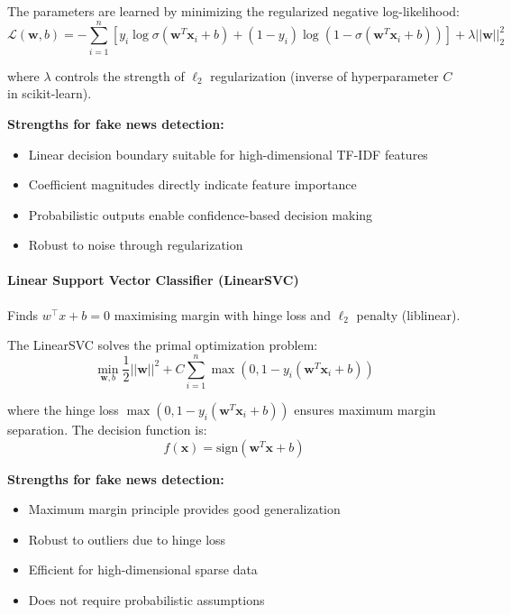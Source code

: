 \documentclass[11pt]{article}
\begin{document}
The parameters are learned by minimizing the regularized negative log-likelihood:
\begin{equation}
\mathcal{L}(\mathbf{w}, b) = -\sum_{i=1}^{n} \left[y_i \log \sigma(\mathbf{w}^T\mathbf{x}_i + b) + (1-y_i) \log (1-\sigma(\mathbf{w}^T\mathbf{x}_i + b))\right] + \lambda ||\mathbf{w}||_2^2
\end{equation}

where $\lambda$ controls the strength of $\ell_2$ regularization (inverse of hyperparameter $C$ in scikit-learn).

\textbf{Strengths for fake news detection:}
\begin{itemize}
\item Linear decision boundary suitable for high-dimensional TF-IDF features
\item Coefficient magnitudes directly indicate feature importance
\item Probabilistic outputs enable confidence-based decision making
\item Robust to noise through regularization
\end{itemize}

\paragraph{Linear Support Vector Classifier (LinearSVC)}
Finds $w^\top x + b = 0$ maximising margin with hinge loss
and $\ell_2$ penalty (liblinear).

The LinearSVC solves the primal optimization problem:
\begin{equation}
\min_{\mathbf{w}, b} \frac{1}{2}||\mathbf{w}||^2 + C \sum_{i=1}^{n} \max(0, 1 - y_i(\mathbf{w}^T\mathbf{x}_i + b))
\end{equation}

where the hinge loss $\max(0, 1 - y_i(\mathbf{w}^T\mathbf{x}_i + b))$ ensures maximum margin separation. The decision function is:
\begin{equation}
f(\mathbf{x}) = \text{sign}(\mathbf{w}^T\mathbf{x} + b)
\end{equation}

\textbf{Strengths for fake news detection:}
\begin{itemize}
\item Maximum margin principle provides good generalization
\item Robust to outliers due to hinge loss
\item Efficient for high-dimensional sparse data
\item Does not require probabilistic assumptions
\end{itemize}
\end{document}

